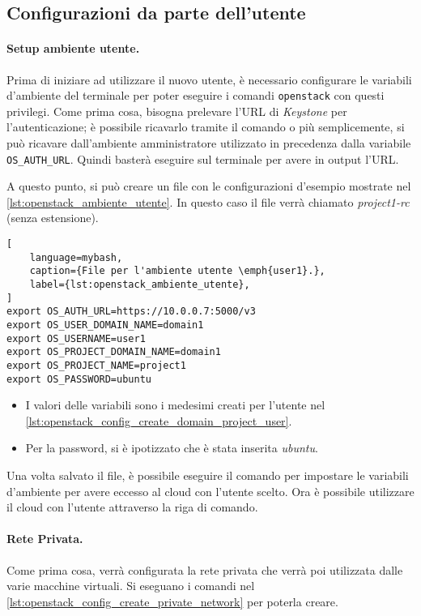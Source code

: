 \subsection{Configurazioni da parte dell'utente}
\paragraph{Setup ambiente utente.}
Prima di iniziare ad utilizzare il nuovo utente, è necessario configurare le variabili d'ambiente del terminale per poter eseguire i comandi \texttt{openstack} con questi privilegi.
% 
Come prima cosa, bisogna prelevare l'URL di \emph{Keystone} per l'autenticazione; 
% 
è possibile ricavarlo tramite il comando  o più semplicemente, si può ricavare dall'ambiente amministratore utilizzato in precedenza dalla variabile \texttt{OS\_AUTH\_URL}.
% 
Quindi basterà eseguire sul terminale  per avere in output l'URL.

A questo punto, si può creare un file con le configurazioni d'esempio mostrate nel \cref{lst:openstack_ambiente_utente}.
% 
In questo caso il file verrà chiamato \emph{project1-rc} (senza estensione).

\begin{lstlisting}[
    language=mybash, 
    caption={File per l'ambiente utente \emph{user1}.},
    label={lst:openstack_ambiente_utente},
]
export OS_AUTH_URL=https://10.0.0.7:5000/v3
export OS_USER_DOMAIN_NAME=domain1
export OS_USERNAME=user1
export OS_PROJECT_DOMAIN_NAME=domain1
export OS_PROJECT_NAME=project1
export OS_PASSWORD=ubuntu
\end{lstlisting}
\begin{itemize}
    \item I valori delle variabili sono i medesimi creati per l'utente nel \cref{lst:openstack_config_create_domain_project_user}.
    \item Per la password, si è ipotizzato che è stata inserita \emph{ubuntu}.
\end{itemize}

\noindent
Una volta salvato il file, è possibile eseguire il comando  per impostare le variabili d'ambiente per avere eccesso al cloud con l'utente scelto.
% 
Ora è possibile utilizzare il cloud con l'utente attraverso la riga di comando.



\paragraph{Rete Privata.}
Come prima cosa, verrà configurata la rete privata che verrà poi utilizzata dalle varie macchine virtuali.
% 
Si eseguano i comandi nel \cref{lst:openstack_config_create_private_network} per poterla creare.

